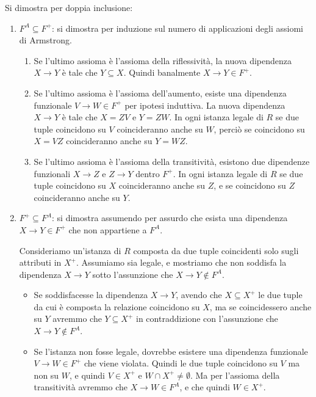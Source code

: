 Si dimostra per doppia inclusione:
\begin{enumerate}
    \item $F^A \subseteq F^+$: si dimostra per induzione sul numero di applicazioni degli assiomi di Armstrong. 
    \begin{enumerate}
        \item Se l'ultimo assioma \`e l'assioma della riflessivit\`a, la nuova dipendenza $X \to Y$ \`e tale che $Y \subseteq X$. Quindi banalmente $X \to Y \in F^+$.
        \item Se l'ultimo assioma \`e l'assioma dell'aumento, esiste una dipendenza funzionale $V \to W \in F^+$ per ipotesi induttiva. La nuova dipendenza $X \to Y$ \`e tale che $X = ZV$ e $Y = ZW$. In ogni istanza legale di $R$ se due tuple coincidono su $V$ coincideranno anche su $W$, perci\`o se coincidono su $X = VZ$ coincideranno anche su $Y = WZ$.
        \item Se l'ultimo assioma \`e l'assioma della transitivit\`a, esistono due dipendenze funzionali $X \to Z$ e $Z \to Y$ dentro $F^+$. In ogni istanza legale di $R$ se due tuple coincidono su $X$ coincideranno anche su $Z$, e se coincidono su $Z$ coincideranno anche su $Y$.
    \end{enumerate}
    \item $F^+ \subseteq F^A$: si dimostra assumendo per assurdo che esista una dipendenza $X \to Y \in F^+$ che non appartiene a $F^A$.

    Consideriamo un'istanza di $R$ composta da due tuple coincidenti solo sugli attributi in $X^+$. Assumiamo sia legale, e mostriamo che non soddisfa la dipendenza $X \to Y$ sotto l'assunzione che $X \to Y \notin F^A$.
    \begin{itemize}
        \item Se soddisfacesse la dipendenza $X \to Y$, avendo che $X \subseteq X^+$ le due tuple da cui \`e composta la relazione coincidono su $X$, ma se coincidessero anche su $Y$ avremmo che $Y \subseteq X^+$ in contraddizione con l'assunzione che $X \to Y \notin F^A$.
        \item Se l'istanza non fosse legale, dovrebbe esistere una dipendenza funzionale $V \to W \in F^+$ che viene violata. Quindi le due tuple coincidono su $V$ ma non su $W$, e quindi $V \in X^+$ e $W \cap X^+ \neq \emptyset$. Ma per l'assioma della transitivit\`a avremmo che $X \to W \in F^A$, e che quindi $W \in X^+$.
    \end{itemize}
\end{enumerate}

